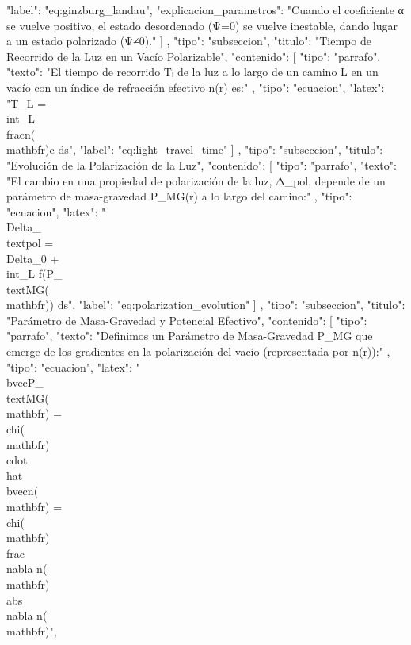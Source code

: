 \documentclass{article}
\begin{document}
{{{{              "label": "eq:ginzburg_landau",
              "explicacion_parametros": "Cuando el coeficiente α se vuelve positivo, el estado desordenado (Ψ=0) se vuelve inestable, dando lugar a un estado polarizado (Ψ≠0)."
            }
          ]
        },
        {
          "tipo": "subseccion",
          "titulo": "Tiempo de Recorrido de la Luz en un Vacío Polarizable",
          "contenido": [
            {
              "tipo": "parrafo",
              "texto": "El tiempo de recorrido Tₗ de la luz a lo largo de un camino L en un vacío con un índice de refracción efectivo n(r) es:"
            },
            {
              "tipo": "ecuacion",
              "latex": "T_L = \\int_{L} \\frac{n(\\mathbf{r})}{c} ds",
              "label": "eq:light_travel_time"
            }
          ]
        },
        {
          "tipo": "subseccion",
          "titulo": "Evolución de la Polarización de la Luz",
          "contenido": [
            {
              "tipo": "parrafo",
              "texto": "El cambio en una propiedad de polarización de la luz, Δ_pol, depende de un parámetro de masa-gravedad P_MG(r) a lo largo del camino:"
            },
            {
              "tipo": "ecuacion",
              "latex": "\\Delta_{\\text{pol}} = \\Delta_0 + \\int_{L} f(P_{\\text{MG}}(\\mathbf{r})) ds",
              "label": "eq:polarization_evolution"
            }
          ]
        },
        {
          "tipo": "subseccion",
          "titulo": "Parámetro de Masa-Gravedad y Potencial Efectivo",
          "contenido": [
            {
              "tipo": "parrafo",
              "texto": "Definimos un Parámetro de Masa-Gravedad P_MG que emerge de los gradientes en la polarización del vacío (representada por n(r)):"
            },
            {
              "tipo": "ecuacion",
              "latex": "\\bvec{P}_{\\text{MG}}(\\mathbf{r}) = \\chi(\\mathbf{r}) \\cdot \\hat{\\bvec{n}}(\\mathbf{r}) = \\chi(\\mathbf{r}) \\frac{\\nabla n(\\mathbf{r})}{\\abs{\\nabla n(\\mathbf{r})}}",
}}}}
\end{document}

